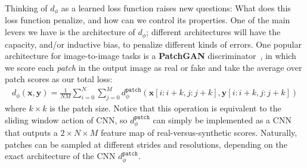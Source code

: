 Thinking of $d_{\phi}$ as a learned loss function raises new questions: What does this loss function penalize, and how can we control its properties. One of the main levers we have is the architecture of $d_{\phi}$; different architectures will have the capacity, and/or inductive bias, to penalize different kinds of errors. One popular architecture for image-to-image tasks is a \textbf{PatchGAN} discriminator~\cite{pix2pix2017}, in which we score each \textit{patch} in the output image as real or fake and take the average over patch scores as our total loss:
\begin{align}
    d_{\phi}(\mathbf{x}, \mathbf{y}) = \frac{1}{NM} \sum_{i=0}^N \sum_{j=0}^M d_{\phi}^{\texttt{patch}}(\mathbf{x}[i:i+k,j:j+k], \mathbf{y}[i:i+k,j:j+k]) \label{eqn:conditional_generative_models:patchgan_objective}
\end{align}
where $k \times k$ is the patch size. Notice that this operation is equivalent to the sliding window action of CNN, so $d_{\phi}^{\texttt{patch}}$ can simply be implemented as a CNN that outputs a $2 \times N \times M$ feature map of real-versus-synthetic scores. Naturally, patches can be sampled at different strides and resolutions, depending on the exact architecture of the CNN $d_{\phi}^{\texttt{patch}}$.

